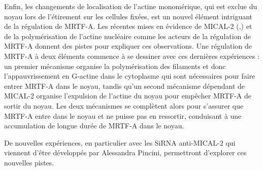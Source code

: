 Enfin, les changements de localisation de l'actine monomérique, qui est exclue du noyau lors de l'étirement sur les cellules fixées, est un nouvel élément intriguant de la régulation de MRTF-A. Les récentes mises en évidence de MICAL-2  (\cite{lundquist_redox_2014},\cite{collard_nuclear_2014}) et de la polymérisation de l'actine nucléaire \parencite{baarlink_nuclear_2013} comme les acteurs de la régulation de MRTF-A donnent des pistes pour expliquer ces observations. Une régulation de MRTF-A à deux éléments commence à se dessiner avec ces dernières expériences : un premier mécanisme organise la polymérisation des filaments et donc l'appauvrissement en G-actine dans le cytoplasme qui sont nécessaires pour faire entrer MRTF-A dans le noyau, tandis qu'un second mécanisme dépendant de MICAL-2 organise l'expulsion de l'actine du noyau pour empêcher MRTF-A de sortir du noyau. Les deux mécanismes se complètent alors pour s'assurer que MRTF-A entre dans le noyau et ne puisse pas en ressortir, conduisant à une accumulation de longue durée de MRTF-A dans le noyau.

De nouvelles expériences, en particulier avec les SiRNA anti-MICAL-2 qui viennent d'être développés par Alessandra Pincini, permettront d'explorer ces nouvelles pistes.  




%
%

